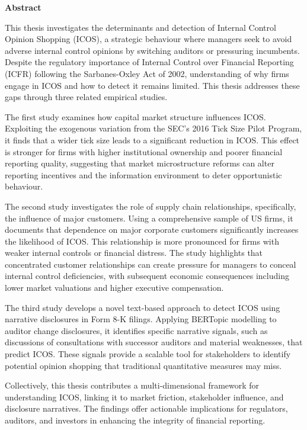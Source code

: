 \documentclass[12pt, a4paper]{report}
\begin{document}
\newpage
\thispagestyle{plain}
\begin{center}
    {\Large \bfseries Abstract \par}
    \vspace{0.5cm}
\end{center}
\begin{onehalfspace}
    This thesis investigates the determinants and detection of Internal Control Opinion Shopping (ICOS), a strategic behaviour where managers seek to avoid adverse internal control opinions by switching auditors or pressuring incumbents. Despite the regulatory importance of Internal Control over Financial Reporting (ICFR) following the Sarbanes-Oxley Act of 2002, understanding of why firms engage in ICOS and how to detect it remains limited. This thesis addresses these gaps through three related empirical studies.

    The first study examines how capital market structure influences ICOS. Exploiting the exogenous variation from the SEC's 2016 Tick Size Pilot Program, it finds that a wider tick size leads to a significant reduction in ICOS. This effect is stronger for firms with higher institutional ownership and poorer financial reporting quality, suggesting that market microstructure reforms can alter reporting incentives and the information environment to deter opportunistic behaviour.

    The second study investigates the role of supply chain relationships, specifically, the influence of major customers. Using a comprehensive sample of US firms, it documents that dependence on major corporate customers significantly increases the likelihood of ICOS. This relationship is more pronounced for firms with weaker internal controls or financial distress. The study highlights that concentrated customer relationships can create pressure for managers to conceal internal control deficiencies, with subsequent economic consequences including lower market valuations and higher executive compensation.

    The third study develops a novel text-based approach to detect ICOS using narrative disclosures in Form 8-K filings. Applying BERTopic modelling to auditor change disclosures, it identifies specific narrative signals, such as discussions of consultations with successor auditors and material weaknesses, that predict ICOS. These signals provide a scalable tool for stakeholders to identify potential opinion shopping that traditional quantitative measures may miss.

    Collectively, this thesis contributes a multi-dimensional framework for understanding ICOS, linking it to market friction, stakeholder influence, and disclosure narratives. The findings offer actionable implications for regulators, auditors, and investors in enhancing the integrity of financial reporting.
\end{onehalfspace}
\newpage
\end{document}
